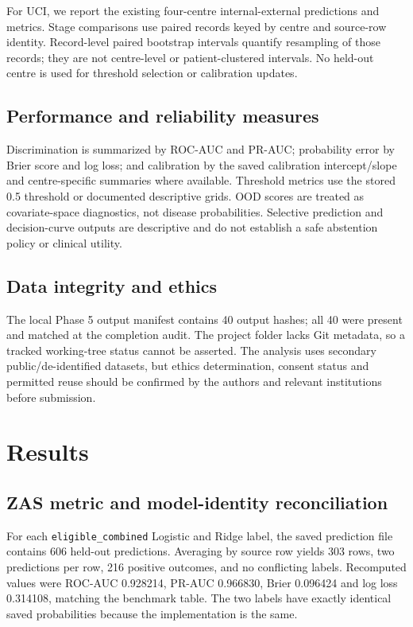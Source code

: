 \documentclass[11pt]{article}
\begin{document}
For UCI, we report the existing four-centre internal-external predictions and metrics. Stage comparisons use paired records keyed by centre and source-row identity. Record-level paired bootstrap intervals quantify resampling of those records; they are not centre-level or patient-clustered intervals. No held-out centre is used for threshold selection or calibration updates.

\subsection{Performance and reliability measures}
Discrimination is summarized by ROC-AUC and PR-AUC; probability error by Brier score and log loss; and calibration by the saved calibration intercept/slope and centre-specific summaries where available. Threshold metrics use the stored 0.5 threshold or documented descriptive grids. OOD scores are treated as covariate-space diagnostics, not disease probabilities. Selective prediction and decision-curve outputs are descriptive and do not establish a safe abstention policy or clinical utility.

\subsection{Data integrity and ethics}
The local Phase 5 output manifest contains 40 output hashes; all 40 were present and matched at the completion audit. The project folder lacks Git metadata, so a tracked working-tree status cannot be asserted. The analysis uses secondary public/de-identified datasets, but ethics determination, consent status and permitted reuse should be confirmed by the authors and relevant institutions before submission.

\section{Results}
\subsection{ZAS metric and model-identity reconciliation}
For each \texttt{eligible\_combined} Logistic and Ridge label, the saved prediction file contains 606 held-out predictions. Averaging by source row yields 303 rows, two predictions per row, 216 positive outcomes, and no conflicting labels. Recomputed values were ROC-AUC 0.928214, PR-AUC 0.966830, Brier 0.096424 and log loss 0.314108, matching the benchmark table. The two labels have exactly identical saved probabilities because the implementation is the same.
\end{document}
